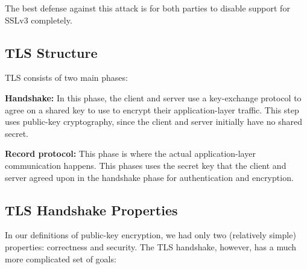 The best defense against this attack is for both parties to
disable support for SSLv3 completely.

\subsection{TLS Structure}
TLS consists of two main phases:
\begin{compactenum}
\item \textbf{Handshake:}
  In this phase, the client and server use a key-exchange protocol to agree on a shared key to use to encrypt their application-layer traffic. This step uses public-key cryptography, since the client and server initially have no shared secret.
\item \textbf{Record protocol:} This phase is where the actual application-layer communication happens. This phases uses the secret key that the client and server agreed  upon in the handshake phase for authentication and encryption. 
\end{compactenum}

\subsection{TLS Handshake Properties}
In our definitions of public-key encryption, we
had only two (relatively simple) properties: 
correctness and security. 
The TLS handshake, however, has a much more complicated
set of goals:

